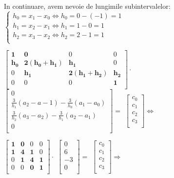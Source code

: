 \documentclass{article}
\begin{document}
In continuare, avem nevoie de lungimile subintervalelor:
$\begin{cases}
  h_0 = x_1 - x_0 \iff h_0 = 0 - (-1) = 1 \\
  h_1 = x_2 - x_1 \iff h_1 = 1 - 0 = 1 \\
  h_2 = x_3 - x_2 \iff h_2 = 2 - 1 = 1 \\
\end{cases}$\vspace{0.35cm}


$\begin{bmatrix}
    \mathbf{1} & \mathbf{0} & 0 & 0 \\
    \mathbf{h_0} & \mathbf{2(h_0+h_1)} & \mathbf{h_1} & 0 \\
    0 & \mathbf{h_1} & \mathbf{2(h_1+h_2)} & \mathbf{h_2} \\
    0 & 0 & 0 & \mathbf{1} \\
\end{bmatrix} \cdot $
$\begin{bmatrix}
    0 \\
    \frac{3}{h_1}(a_2-a-1) - \frac{3}{h_0}(a_1-a_0) \\
    \frac{3}{h_2}(a_3-a_2) - \frac{3}{h_1}(a_2-a_1) \\
    0 \\
\end{bmatrix} = $
$\begin{bmatrix}
    c_0 \\
    c_1 \\
    c_2 \\
    c_3 \\
\end{bmatrix} \iff$\vspace{0.25cm}

$\begin{bmatrix}
    \mathbf{1} & \mathbf{0} & 0 & 0 \\
    \mathbf{1} & \mathbf{4} & \mathbf{1} & 0 \\
    0 & \mathbf{1} & \mathbf{4} & \mathbf{1} \\
    0 & 0 & \mathbf{0} & \mathbf{1} \\
\end{bmatrix} \cdot $
$\begin{bmatrix}
    0 \\
    6 \\
    -3 \\
    0 \\
\end{bmatrix} = $
$\begin{bmatrix}
    c_0 \\
    c_1 \\
    c_2 \\
    c_3 \\
\end{bmatrix} \Longrightarrow$
\\\\
\end{document}

